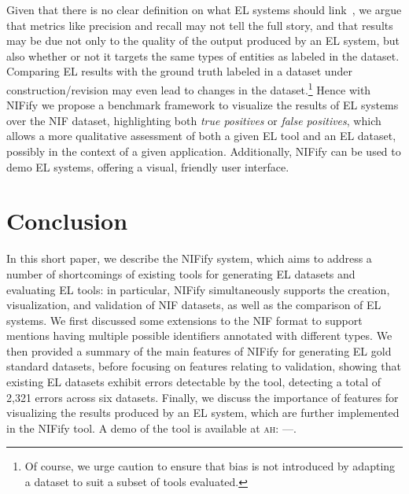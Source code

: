 \documentclass[sigconf]{acmart}
\newcommand{\ah}[1]{{\color{blue}\textsc{ah:} #1}}
\begin{document}
Given that there is no clear definition on what EL systems should link~\cite{ourAMW2018}, we argue that metrics like precision and recall may not tell the full story, and that results may be due not only to the quality of the output produced by an EL system, but also whether or not it targets the same types of entities as labeled in the dataset. Comparing EL results with the ground truth labeled in a dataset under construction/revision may even lead to changes in the dataset.\footnote{Of course, we urge caution to ensure that bias is not introduced by adapting a dataset to suit a subset of tools evaluated.} Hence with NIFify we propose a benchmark framework to visualize the results of EL systems over the NIF dataset, highlighting both \textit{true positives} or \textit{false positives}, which allows a more qualitative assessment of both a given EL tool and an EL dataset, possibly in the context of a given application. Additionally, NIFify can be used to demo EL systems, offering a visual, friendly user interface.


\section{Conclusion} 
\label{sec:conclusion}
In this short paper, we describe the NIFify system, which aims to address a number of shortcomings of existing tools for generating EL datasets and evaluating EL tools: in particular, NIFify simultaneously supports the creation, visualization, and validation of NIF datasets, as well as the comparison of EL systems. We first discussed some extensions to the NIF format to support mentions having multiple possible identifiers annotated with different types. We then provided a summary of the main features of NIFify for generating EL gold standard datasets, before focusing on features relating to validation, showing that existing EL datasets exhibit errors detectable by the tool, detecting a total of 2,321 errors across six datasets. Finally, we discuss the importance of features for visualizing the results produced by an EL system, which are further implemented in the NIFify tool. A demo of the tool is available at \ah{---}. 

\end{document}

